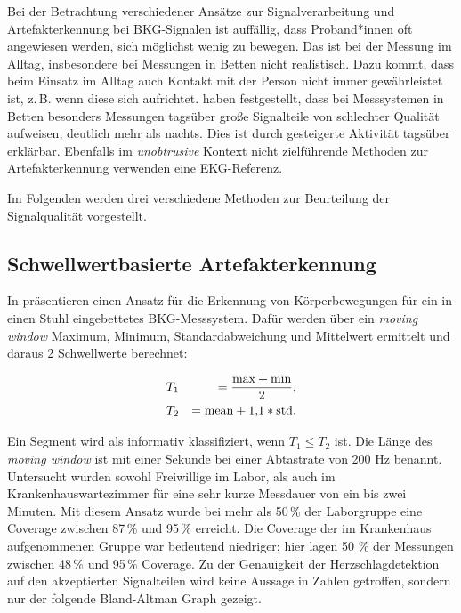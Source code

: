 		
	Bei der Betrachtung verschiedener Ansätze zur Signalverarbeitung und Artefakterkennung bei \ac{BKG}-Signalen ist auffällig, dass Proband*innen oft angewiesen werden, sich möglichst wenig zu bewegen. Das ist bei der Messung im Alltag, insbesondere bei Messungen in Betten nicht realistisch. Dazu kommt, dass beim Einsatz im Alltag auch Kontakt mit der Person nicht immer gewährleistet ist, z.\,B. wenn diese sich aufrichtet. \citeauthor{HoogAntink2020} haben festgestellt, dass bei Messsystemen in Betten besonders Messungen tagsüber große Signalteile von schlechter Qualität aufweisen, deutlich mehr als nachts. Dies ist durch gesteigerte Aktivität tagsüber erklärbar. Ebenfalls im \textit{unobtrusive} Kontext nicht zielführende Methoden zur Artefakterkennung verwenden eine \ac{EKG}-Referenz.
	
	Im Folgenden werden drei verschiedene Methoden zur Beurteilung der Signalqualität vorgestellt.

	\subsection{Schwellwertbasierte Artefakterkennung}
	
	In  präsentieren \citeauthor{Pino2015} einen Ansatz für die Erkennung von Körperbewegungen für ein in einen Stuhl eingebettetes \ac{BKG}-Messsystem. Dafür werden über ein \textit{moving window} Maximum, Minimum, Standardabweichung und Mittelwert ermittelt und daraus 2 Schwellwerte berechnet:
	
	\begin{eqnarray*}
		&T_1 &= \frac{\text{max} + \text{min}}{2},\notag\\
		&T_2 &= \text{mean} + 1{,}1 * \text{std}.\notag
	\end{eqnarray*}
	
	Ein Segment wird als informativ klassifiziert, wenn $T_1 \leq T_2$ ist. Die Länge des \textit{moving window} ist mit einer Sekunde bei einer Abtastrate von 200 Hz benannt. Untersucht wurden sowohl Freiwillige im Labor, als auch im Krankenhauswartezimmer für eine sehr kurze Messdauer von ein bis zwei Minuten. Mit diesem Ansatz wurde bei mehr als 50\,\% der Laborgruppe eine Coverage zwischen 87\,\% und 95\,\% erreicht. Die Coverage der im Krankenhaus aufgenommenen Gruppe war bedeutend niedriger; hier lagen 50 \% der Messungen zwischen 48\,\% und 95\,\% Coverage. Zu der Genauigkeit der Herzschlagdetektion auf den akzeptierten Signalteilen wird keine Aussage in Zahlen getroffen, sondern nur der folgende Bland-Altman Graph gezeigt.
	
